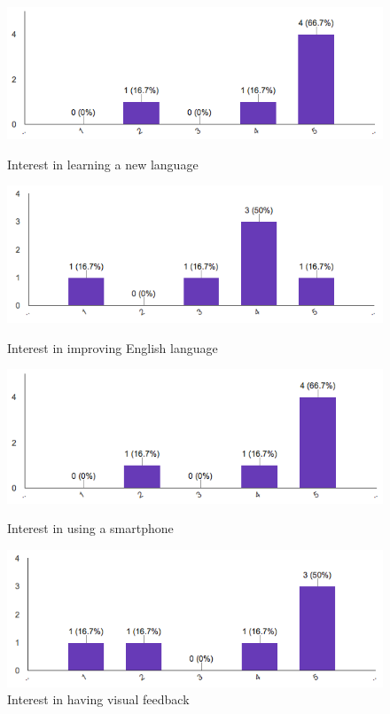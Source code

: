 \begin{figure}[!ht]
	\centering
	\begin{minipage}{.5\textwidth}
		\centering
		\includegraphics[scale=0.4]{Figures/responses/interest_learning_language.png}
		\caption{Interest in learning a new language}
		\label{fig:int_learnign_lang}
	\end{minipage}%
	\begin{minipage}{.5\textwidth}
		\centering
		\includegraphics[scale=0.4]{Figures/responses/interest_improving_lang.png}
		\caption{Interest in improving English language}
		\label{fig:int_improving_lang}
	\end{minipage}
    \begin{minipage}{.5\textwidth}
        \centering
        \includegraphics[scale=0.4]{Figures/responses/interest_usage_smartphone.png}
        \caption{Interest in using a smartphone}
        \label{fig:int_usage_smartphone}
    \end{minipage}%
	\begin{minipage}{.5\textwidth}
		\centering
		\includegraphics[scale=0.4]{Figures/responses/interest_visual_feedback.png}
		\caption{Interest in having visual feedback}
		\label{fig:int_visual_feedbak}
	\end{minipage}%
\end{figure}

